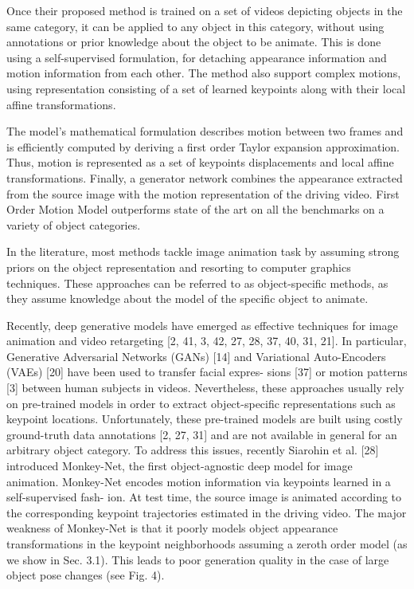 \documentclass[english,12pt]{article}
\begin{document}
Once their proposed method is trained on a set of videos depicting objects in the same category, it can be
applied to any object in this category, without using annotations or prior knowledge about the object to be
animate.
This is done using a self-supervised formulation, for detaching appearance information and motion information
from each other. The method also support complex motions, using representation consisting of a set of learned
keypoints along with their local affine transformations.

The model's mathematical formulation describes motion between two frames and is efficiently computed by
deriving a first order Taylor expansion approximation. Thus, motion is represented as a set of keypoints
displacements and local affine transformations.
Finally, a generator network combines the appearance extracted from the source image with the motion
representation of the driving video. First Order Motion Model outperforms state of the art on all the
benchmarks on a variety of object categories.


In the literature, most methods tackle image animation task by assuming strong priors on the object
representation and resorting to computer graphics techniques. These approaches can be referred to as
object-specific methods, as they assume knowledge about the model of the specific object to animate.

Recently, deep generative models have emerged as effective techniques for image animation and video
retargeting [2, 41, 3, 42, 27, 28, 37, 40, 31, 21]. In particular, Generative Adversarial Networks (GANs)
[14] and Variational Auto-Encoders (VAEs) [20] have been used to transfer facial expres- sions [37] or
motion patterns [3] between human subjects in videos. Nevertheless, these approaches usually rely on
pre-trained models in order to extract object-specific representations such as keypoint locations.
Unfortunately, these pre-trained models are built using costly ground-truth data annotations [2, 27, 31]
and are not available in general for an arbitrary object category. To address this issues, recently
Siarohin et al. [28] introduced Monkey-Net, the first object-agnostic deep model for image animation.
Monkey-Net encodes motion information via keypoints learned in a self-supervised fash- ion. At test time,
the source image is animated according to the corresponding keypoint trajectories estimated in the driving
video. The major weakness of Monkey-Net is that it poorly models object appearance transformations in the
keypoint neighborhoods assuming a zeroth order model (as we show in Sec. 3.1). This leads to poor generation
quality in the case of large object pose changes (see Fig. 4).
\end{document}
